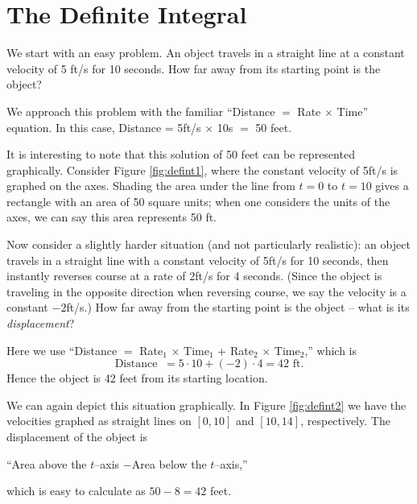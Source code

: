\section{The Definite Integral}\label{sec:def_int}

We start with an easy problem. An object travels in a straight line at a constant velocity of 5 ft/s for 10 seconds. How far away from its starting point is the object?

We approach this problem with the familiar ``Distance $=$ Rate $\times$ Time'' equation. In this case, Distance = 5ft/s $\times$ 10s $=$ 50 feet.

It is interesting to note that this solution of 50 feet can be represented graphically. Consider Figure \ref{fig:defint1}, where the constant velocity of 5ft/s is graphed on the axes. Shading the area under the line from $t=0$ to $t=10$ gives a rectangle with an area of 50 square units; when one considers the units of the axes, we can say this area represents 50 ft.


Now consider a slightly harder situation (and not particularly realistic): an object travels in a straight line with a constant velocity of 5ft/s for 10 seconds, then instantly reverses course at a rate of 2ft/s for 4 seconds. (Since the object is traveling in the opposite direction when reversing course, we say the velocity is a constant $-2$ft/s.) How far away from the starting point is the object -- what is its \textit{displacement}?

Here we use ``Distance $=$ Rate$_1$ $\times$ Time$_1$ + Rate$_2$ $\times$ Time$_2$,'' which is 
	$$\text{Distance } \ = 5\cdot10 + (-2)\cdot 4 = 42\text{ ft.}$$ 
Hence the object is 42 feet from its starting location.

We can again depict this situation graphically. In Figure \ref{fig:defint2} we have the velocities graphed as straight lines on $[0,10]$ and $[10,14]$, respectively. The displacement of the object is 
		\begin{center}``Area above the $t$--axis \quad $-$\quad Area below the $t$--axis,''
		\end{center}
which is easy to calculate as $50-8=42$ feet.


